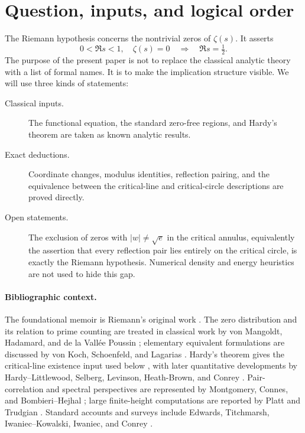 \documentclass[submission,noinfoline]{jsfds}
\begin{document}
\section{Question, inputs, and logical order}\label{sec:intro}

The Riemann hypothesis concerns the nontrivial zeros of
$\zeta(s)$. It asserts
\[
  0<\Re s<1,\quad \zeta(s)=0
  \quad\Longrightarrow\quad \Re s=\tfrac12 .
\]
The purpose of the present paper is not to replace the classical analytic
theory with a list of formal names. It is to make the implication structure
visible. We will use three kinds of statements:

\begin{description}
\item[Classical inputs.] The functional equation, the standard zero-free
regions, and Hardy's theorem are taken as known analytic results.
\item[Exact deductions.] Coordinate changes, modulus identities, reflection
pairing, and the equivalence between the critical-line and critical-circle
descriptions are proved directly.
\item[Open statements.] The exclusion of zeros with $|w|\neq\sqrt e$ in the
critical annulus, equivalently the assertion that every reflection pair lies
entirely on the critical circle, is exactly the Riemann hypothesis. Numerical
density and energy heuristics are not used to hide this gap.
\end{description}

\paragraph{Bibliographic context.}
The foundational memoir is Riemann's original work \citep{Riemann1859}.
The zero distribution and its relation to prime counting are treated in
classical work by von Mangoldt, Hadamard, and de la Vall{\'e}e Poussin
\citep{vonMangoldt1905,Hadamard1893,deLaValleePoussin1899}; elementary
equivalent formulations are discussed by von Koch, Schoenfeld, and Lagarias
\citep{vonKoch1901,Schoenfeld1976,Lagarias2002}. Hardy's theorem gives the
critical-line existence input used below \citep{Hardy1914}, with later
quantitative developments by Hardy--Littlewood, Selberg, Levinson,
Heath-Brown, and Conrey \citep{HardyLittlewood1921,Selberg1942,
Levinson1974,HeathBrown1979,Conrey1989}. Pair-correlation and spectral
perspectives are represented by Montgomery, Connes, and Bombieri--Hejhal
\citep{Montgomery1973,Montgomery1977,Connes1999,BombieriHejhal1995}; large
finite-height computations are reported by Platt and Trudgian
\citep{PlattTrudgian2021}. Standard accounts and surveys include
Edwards, Titchmarsh, Iwaniec--Kowalski, Iwaniec, and Conrey
\citep{Edwards1974,Titchmarsh1986,IwaniecKowalski2004,Iwaniec2014,
Conrey2003}.
\end{document}
